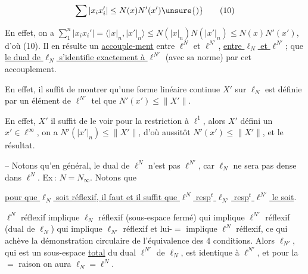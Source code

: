 

\[
\sum|x_i x_i'|\leq N(x)N'(x')\unsure{)}\tag*{(10)}
\]

En effet, on a $\sum_{1}^{n}|x_i x_i'|=\langle |x|_n,|x'|_n\rangle\leq N(|x|_n)N(|x'|_n)\leq N(x)N'(x')$\unsure{)}, d'où (10). Il en résulte un \uline{accouple-}\newline\uline{ment} entre $\ell^N$ et $\ell^{N'}$,   \uline{entre $\ell_N$ et $\ell^{N'}$};   que \uline{le dual de $\ell_N$ s'identifie exactement à $\ell^{N'}$} (avec sa norme) par cet accouplement.


En effet,  il suffit de montrer qu'une forme linéaire continue $X'$ sur $\ell_N$ est définie par un  élément de $\ell^{N'}$  tel que $N'(x')\leq\lVert X'\rVert$.

En effet, $X'$  il suffit de le voir pour la  restriction à $\ell^1$, alors $X'$  défini   un $x'\in\ell^\infty$,  on a $N'(|x'|_n)\leq\lVert X'\rVert$, d'où aussitôt $N'(x')\leq\lVert X'\rVert$, et le résultat.

-- Notons qu'en général, le dual de $\ell^N$ n'est pas $\ell^{N'}$,  car $\ell_N$ ne sera pas dense dans $\ell^N$. Ex\,: $N=N_\infty$. Notons que

\uline{pour que $\ell_N$ soit réflexif, il faut et il suffit que $\ell^N$ resp$^t$ $\ell_{N'}$ resp$^t$ $\ell^{N'}$ le soit}.  

$\ell^N$ réflexif implique $\ell_N$ réflexif (sous-espace fermé) qui implique $\ell^{N'}$ réflexif (dual de $\ell_N$) qui  implique $\ell_{N'}$ réflexif et lui-$=$ implique $\ell^N$ réflexif, ce qui achève la démonstration  circulaire de l'équivalence des 4 conditions. Alors $\ell_{N'}$, qui est un sous-espace  \uline{total}  du dual $\ell^{N'}$ de $\ell_N$, est identique à $\ell^{N'}$, et pour la $=$ raison on aura $\ell_N=\ell^N$.

